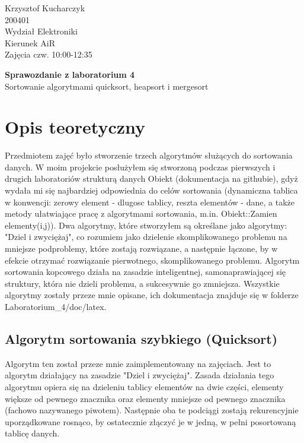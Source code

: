 \documentclass[a4paper,12pt]{article}
\begin{document}
{\raggedleft{}Krzysztof Kucharczyk}\\200401\\Wydział Elektroniki\\Kierunek AiR\\Zajęcia czw. 10:00-12:35

\begin{center} 
	\textbf{{\large Sprawozdanie z laboratorium 4}}\\Sortowanie algorytmami quicksort, heapsort i mergesort	
\end{center}

\section{Opis teoretyczny}

Przedmiotem zajęć było stworzenie trzech algorytmów służących do sortowania danych. W moim projekcie posłużyłem się stworzoną podczas pierwszych i drugich 
laboratoriów strukturą danych Obiekt (dokumentacja na githubie), gdyż wydała mi się najbardziej odpowiednia do celów sortowania (dynamiczna tablica w konwencji: zerowy element - dlugosc tablicy, reszta elementów - dane, a także metody ułatwiające pracę z algorytmami sortowania, m.in. Obiekt::Zamien elementy(i,j)). Dwa algorytmy, które stworzyłem
są określane jako algorytmy: "Dziel i zwyciężaj", co rozumiem jako dzielenie skomplikowanego problemu na mniejsze podproblemy, które zostają rozwiązane, a następnie
łączone, by w efekcie otrzymać rozwiązanie pierwotnego, skomplikowanego problemu. Algorytm sortowania kopcowego działa na zasadzie 
inteligentnej, samonaprawiającej się struktury, która nie dzieli problemu, a sukcesywnie go zmniejsza. Wszystkie algorytmy zostały przeze mnie opisane, ich 
dokumentacja znajduje się w folderze Laboratorium\_4/doc/latex.

\subsection{Algorytm sortowania szybkiego (Quicksort)}

Algorytm ten został przeze mnie zaimplementowany na zajęciach. Jest to algorytm działający na zasadzie "Dziel i zwyciężaj". Zasada działania tego algorytmu opiera się
na dzieleniu tablicy elementów na dwie części, elementy większe od pewnego znacznika oraz elementy mniejsze od pewnego znacznika (fachowo nazywanego piwotem). Następnie oba te podciągi zostają
rekurencyjnie uporządkowane rosnąco, by ostatecznie złączyć je w jedną, w pełni posortowaną tablicę danych. 
\end{document}
